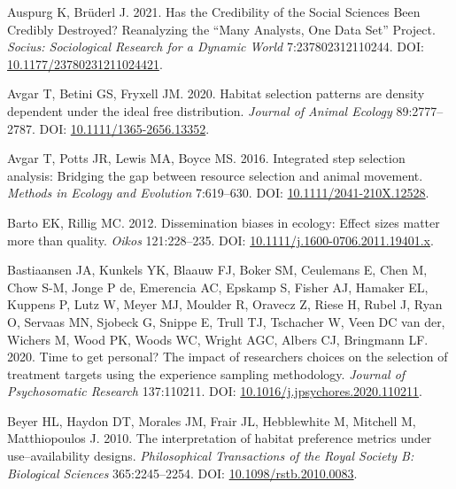 \documentclass[10pt,a4paper]{article}
\newlength{\cslhangindent}
\newlength{\cslentryspacingunit} %
\newenvironment{CSLReferences}[2] %
 {%
  \setlength{\parindent}{0pt}
  \ifodd #1
  \let\oldpar\par
  \def\par{\hangindent=\cslhangindent\oldpar}
  \fi
  \setlength{\parskip}{#2\cslentryspacingunit}
 }%
 {}
\begin{document}
\begin{CSLReferences}{1}{0}
\leavevmode{}%
Auspurg K, Brüderl J. 2021. Has the {Credibility} of the {Social} {Sciences} {Been} {Credibly} {Destroyed}? {Reanalyzing} the {``{Many} {Analysts}, {One} {Data} {Set}''} {Project}. \emph{Socius: Sociological Research for a Dynamic World} 7:237802312110244. DOI: \href{https://doi.org/10.1177/23780231211024421}{10.1177/23780231211024421}.

\leavevmode{}%
Avgar T, Betini GS, Fryxell JM. 2020. Habitat selection patterns are density dependent under the ideal free distribution. \emph{Journal of Animal Ecology} 89:2777--2787. DOI: \href{https://doi.org/10.1111/1365-2656.13352}{10.1111/1365-2656.13352}.

\leavevmode{}%
Avgar T, Potts JR, Lewis MA, Boyce MS. 2016. Integrated step selection analysis: Bridging the gap between resource selection and animal movement. \emph{Methods in Ecology and Evolution} 7:619--630. DOI: \href{https://doi.org/10.1111/2041-210X.12528}{10.1111/2041-210X.12528}.

\leavevmode{}%
Barto EK, Rillig MC. 2012. Dissemination biases in ecology: Effect sizes matter more than quality. \emph{Oikos} 121:228--235. DOI: \href{https://doi.org/10.1111/j.1600-0706.2011.19401.x}{10.1111/j.1600-0706.2011.19401.x}.

\leavevmode{}%
Bastiaansen JA, Kunkels YK, Blaauw FJ, Boker SM, Ceulemans E, Chen M, Chow S-M, Jonge P de, Emerencia AC, Epskamp S, Fisher AJ, Hamaker EL, Kuppens P, Lutz W, Meyer MJ, Moulder R, Oravecz Z, Riese H, Rubel J, Ryan O, Servaas MN, Sjobeck G, Snippe E, Trull TJ, Tschacher W, Veen DC van der, Wichers M, Wood PK, Woods WC, Wright AGC, Albers CJ, Bringmann LF. 2020. Time to get personal? {The} impact of researchers choices on the selection of treatment targets using the experience sampling methodology. \emph{Journal of Psychosomatic Research} 137:110211. DOI: \href{https://doi.org/10.1016/j.jpsychores.2020.110211}{10.1016/j.jpsychores.2020.110211}.

\leavevmode{}%
Beyer HL, Haydon DT, Morales JM, Frair JL, Hebblewhite M, Mitchell M, Matthiopoulos J. 2010. The interpretation of habitat preference metrics under use--availability designs. \emph{Philosophical Transactions of the Royal Society B: Biological Sciences} 365:2245--2254. DOI: \href{https://doi.org/10.1098/rstb.2010.0083}{10.1098/rstb.2010.0083}.


\end{CSLReferences}
\end{document}
